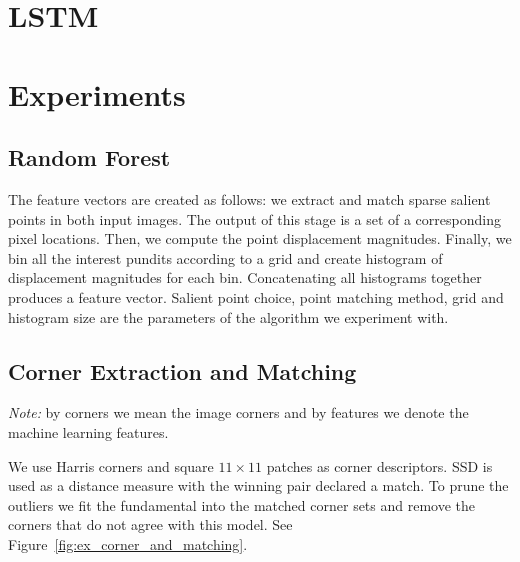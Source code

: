 \documentclass{article}
\begin{document}
\section{LSTM}

\section{Experiments}

\subsection{Random Forest}
The feature vectors are created as follows: we extract and match
sparse salient points in both input images.  The output of this stage
is a set of a corresponding pixel locations.  Then, we compute the
point displacement magnitudes.  Finally, we bin all the interest
pundits according to a grid and create histogram of displacement
magnitudes for each bin.  Concatenating all histograms together
produces a feature vector.  Salient point choice, point matching
method, grid and histogram size are the parameters of the algorithm we
experiment with.

\subsection{Corner Extraction and Matching}

\emph{Note:} by corners we mean the image corners and by features we
denote the machine learning features.

We use Harris corners and square $11\times 11$ patches as corner
descriptors. SSD is used as a distance measure with the winning pair
declared a match.  To prune the outliers we fit the fundamental into
the matched corner sets and remove the corners that do not agree with
this model.  See Figure~\ref{fig:ex_corner_and_matching}.
\end{document}
